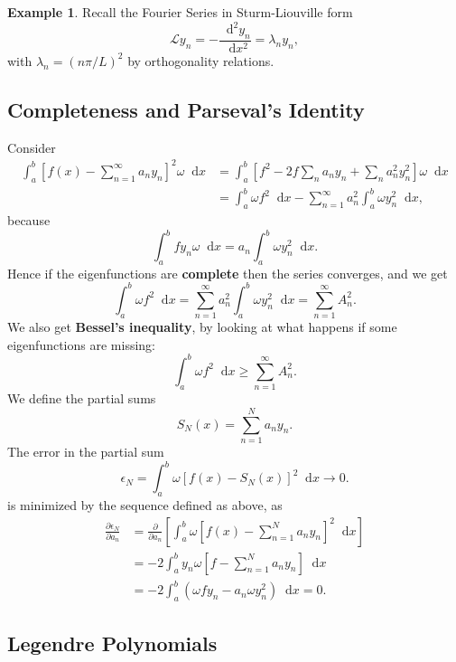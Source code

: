 \documentclass[12pt]{article}
\newcommand{\diff}{\mathop{}\!\mathrm{d}}
\newcommand{\Diff}[1]{\mathop{}\!\mathrm{d}^{#1}}
\theoremstyle{definition}
\newtheorem{example}{Example}[section]
\theoremstyle{remark}
\begin{document}
\begin{adjustbox}{minipage = \columnwidth - 25.5pt, margin=1em, frame=1pt, margin=0em}
\begin{example}
	Recall the Fourier Series in Sturm-Liouville form
	\[
	\mathcal{L}y_n = -\frac{\Diff2 y_n}{\diff x^2} = \lambda_n y_n
	,\]
	with $\lambda_n = (n\pi/L)^2$ by orthogonality relations.
\end{example}

\end{adjustbox}

\subsection{Completeness and Parseval's Identity}%
\label{sub:completeness_and_parseval_s_identity}

Consider
\begin{align*}
	\int_{a}^{b}\left[ f(x) - \sum_{n = 1}^{\infty} a_n y_n \right]^2\omega \diff x &= \int_{a}^{b} \left[f^2 - 2f \sum_{n}a_n y_n + \sum_{n}a_n^2 y_n^2\right] \omega \diff x \\
											&= \int_{a}^{b}\omega f^2 \diff x - \sum_{n = 1}^{\infty}a_n^2 \int_{a}^{b}\omega y_n^2 \diff x,
\end{align*}
because
\[
\int_{a}^{b} f y_n \omega \diff x = a_n \int_{a}^{b} \omega y_n^2 \diff x
.\]
Hence if the eigenfunctions are \textbf{complete} then the series converges, and we get
\[
\int_{a}^{b} \omega f^2 \diff x = \sum_{n = 1}^{\infty} a_n^2 \int_{a}^{b} \omega y_n^2 \diff x = \sum_{n = 1}^{\infty} A_n^2
.\]
We also get \textbf{Bessel's inequality}, by looking at what happens if some eigenfunctions are missing:
\[
\int_{a}^{b} \omega f^2 \diff x \geq \sum_{n = 1}^{\infty} A_n^2
.\]
We define the partial sums
\[
	S_N(x) = \sum_{n = 1}^{N}a_n y_n
.\]
The error in the partial sum
\[
	\epsilon_N = \int_{a}^{b} \omega[f(x) - S_N(x)]^2\diff x \to 0
.\]
is minimized by the sequence defined as above, as
\begin{align*}
	\frac{\partial \epsilon_N}{\partial a_n} &= \frac{\partial}{\partial a_n} \left[ \int_{a}^{b} \omega \left[f(x) - \sum_{n = 1}^{N}a_n y_n\right]^2 \diff x \right] \\
						 &= - 2 \int_{a}^{b} y_n \omega \left[f - \sum_{n = 1}^{N} a_n y_n\right]\diff x \\
						 &= -2 \int_{a}^{b}(\omega f y_n - a_n \omega y_n^2)\diff x = 0.
\end{align*}

\subsection{Legendre Polynomials}%
\label{sub:legendre_polynomials}
\end{document}
